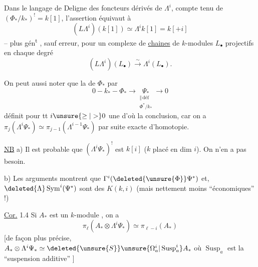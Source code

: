 Dans le langage de Deligne des foncteurs dérivés de $\Lambda^i$,
compte tenu de $(\Phi_*/k_*)^!=k[1]$, l'assertion équivaut à
\[
(L\Lambda^i)(k[1])\simeq\Lambda^i k[1]=k[+i]
\]
-- plus gén\textsuperscript{t} , sauf erreur, pour un complexe de \uline{chaines} de $k$-modules $L_\bullet$
projectifs en chaque degré
\[
(L\Lambda^i)(L_\bullet)\xrightarrow{\sim}\Lambda^i(L_\bullet).
\]

On peut aussi noter que la  de $\Phi_*$ par
\[
0\mathbin{-}k_*\mathbin{-}\Phi_*\longrightarrow
\underset{\substack{\Vert\,\mathrm{déf}\\\Phi^*/k_*}}{\Psi_*}\longrightarrow0
\]
définit pour tt $i\unsure{\geq|>}0$ une 
d'où la conclusion, car on a
$\pi_j(\Lambda^i\Psi_*)\simeq\pi_{j-1}(\Lambda^{i-1}\Psi_*)$
par suite exacte d'homotopie.

\uline{NB} a) Il est probable que $(\Lambda^i\Psi_*)^!$ est  $k[i]$
($k$ placé en dim $i$). On n'en a pas besoin.

b) Les  arguments montrent que
$\Gamma^i(\deleted{\unsure{\Phi}}\Psi^*)$ et, $\deleted{\Lambda}\operatorname{Sym}^i(\Psi^*)$
\inserted{$\otimes\Psi^*$} sont des $K(k,i)$
(mais nettement moins ``économiques'' !)

\uline{Cor.} 1.4 Si $A_*$ est un $k$-module , on a
\[
\pi_\ell(A_*\otimes\Lambda^i\Psi_*)\simeq\pi_{\ell-i}(A_*)
\]
[de façon plus précise, 
$A_*\otimes\Lambda^i\Psi_*\simeq\deleted{\unsure{S}}\unsure{\Omega_a^i|\operatorname{Susp}_a^i}A_*$ \deleted{]}
où $\operatorname{Susp}_a$ est la ``suspension additive'' ]

